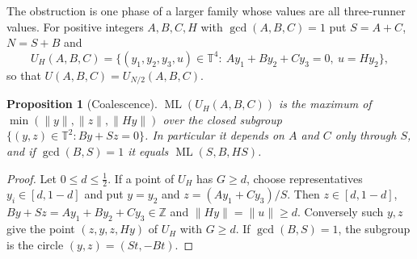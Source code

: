 \documentclass[12pt]{amsart}
\newtheorem{proposition}[theorem]{Proposition}
\theoremstyle{definition}\newtheorem{definition}[theorem]{Definition}
\theoremstyle{remark}\newtheorem{remark}[theorem]{Remark}
\newcommand{\Z}{\mathbb Z}\newcommand{\R}{\mathbb R}\newcommand{\T}{\mathbb T}
\newcommand{\norm}[1]{\lVert #1\rVert}
\newcommand{\ML}{\operatorname{ML}}
\begin{document}
The obstruction is one phase of a larger family whose values are all three-runner values. For positive integers $A,B,C,H$ with $\gcd(A,B,C)=1$ put $S=A+C$, $N=S+B$ and
\[
 U_H(A,B,C)=\{(y_1,y_2,y_3,u)\in\T^4:\ Ay_1+By_2+Cy_3=0,\ u=Hy_2\},
\]
so that $U(A,B,C)=U_{N/2}(A,B,C)$.

\begin{proposition}[Coalescence]\label{prop:coal}
$\ML(U_H(A,B,C))$ is the maximum of $\min(\norm y,\norm z,\norm{Hy})$ over the closed subgroup $\{(y,z)\in\T^2:By+Sz=0\}$. In particular it depends on $A$ and $C$ only through $S$, and if $\gcd(B,S)=1$ it equals $\ML(S,B,HS)$.
\end{proposition}
\begin{proof}
Let $0\le d\le\frac12$. If a point of $U_H$ has $G\ge d$, choose representatives $y_i\in[d,1-d]$ and put $y=y_2$ and $z=(Ay_1+Cy_3)/S$. Then $z\in[d,1-d]$, $By+Sz=Ay_1+By_2+Cy_3\in\Z$ and $\norm{Hy}=\norm u\ge d$. Conversely such $y,z$ give the point $(z,y,z,Hy)$ of $U_H$ with $G\ge d$. If $\gcd(B,S)=1$, the subgroup is the circle $(y,z)=(St,-Bt)$.
\end{proof}
\end{document}
